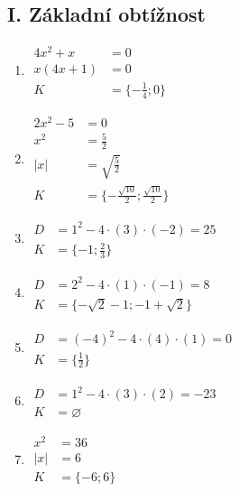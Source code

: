 \documentclass[11pt,a4paper]{article}
\begin{document}
\subsection*{I. Základní obtížnost}
\begin{enumerate}[label={},itemsep=9pt]
\item[\textbf{A001}] \(\displaystyle \begin{aligned}4x^2+x&=0\\x(4x+1)&=0\\K&=\{-\frac14;0\}\end{aligned}\)\par
\item[\textbf{A002}] \(\displaystyle \begin{aligned}2x^2-5&=0\\x^2&=\frac52\\|x|&=\sqrt{\frac52}\\K&=\{-\frac{\sqrt{10}}2;\frac{\sqrt{10}}2\}\end{aligned}\)\par
\item[\textbf{A003}] \(\displaystyle \begin{aligned}D&=1^2-4\cdot(3)\cdot(-2)=25\\K&=\{-1;\frac{2}{3}\}\end{aligned}\)\par
\item[\textbf{A004}] \(\displaystyle \begin{aligned}D&=2^2-4\cdot(1)\cdot(-1)=8\\K&=\{- \sqrt{2} - 1;-1 + \sqrt{2}\}\end{aligned}\)\par
\item[\textbf{A005}] \(\displaystyle \begin{aligned}D&=(-4)^2-4\cdot(4)\cdot(1)=0\\K&=\{\frac{1}{2}\}\end{aligned}\)\par
\item[\textbf{A006}] \(\displaystyle \begin{aligned}D&=1^2-4\cdot(3)\cdot(2)=-23\\K&=\varnothing\end{aligned}\)\par
\item[\textbf{A011}] \(\displaystyle \begin{aligned}x^2&=36\\|x|&=6\\K&=\{-6;6\}\end{aligned}\)\par

\end{enumerate}
\end{document}
